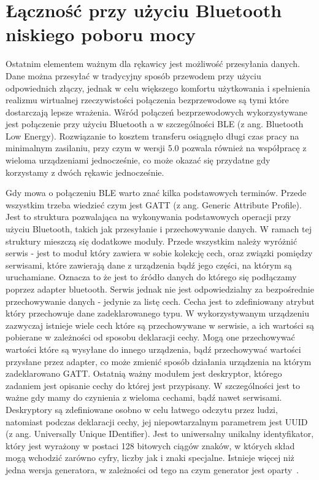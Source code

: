 \section{Łączność przy użyciu Bluetooth niskiego poboru mocy}
\label{sec:bvsble}
Ostatnim elementem ważnym dla rękawicy jest możliwość przesyłania danych. Dane można przesyłać w tradycyjny sposób przewodem przy użyciu odpowiednich złączy, jednak w celu większego komfortu użytkowania i spełnienia realizmu wirtualnej rzeczywistości połączenia bezprzewodowe są tymi które dostarczają lepsze wrażenia. Wśród połączeń bezprzewodowych wykorzystywane jest połączenie przy użyciu Bluetooth a w szczególności BLE (z ang. Bluetooth Low Energy). Rozwiązanie to kosztem transferu osiągnęło długi czas pracy na minimalnym zasilaniu, przy czym w wersji 5.0 pozwala również na współpracę z wieloma urządzeniami jednocześnie, co może okazać się przydatne gdy korzystamy z dwóch rękawic jednocześnie. 

Gdy mowa o połączeniu BLE warto znać kilka podstawowych terminów. Przede wszystkim trzeba wiedzieć czym jest GATT (z ang. Generic Attribute Profile). Jest to struktura pozwalająca na wykonywania podstawowych operacji przy użyciu Bluetooth, takich jak przesyłanie i przechowywanie danych.  W ramach tej struktury mieszczą się dodatkowe moduły. Przede wszystkim należy wyróżnić serwis - jest to moduł który zawiera w sobie kolekcję cech, oraz związki pomiędzy serwisami, które zawierają dane z urządzenia bądź jego części, na którym są uruchamiane. Oznacza to że jest to źródło danych do którego się podłączamy poprzez adapter bluetooth. Serwis jednak nie jest odpowiedzialny za bezpośrednie przechowywanie danych - jedynie za listę cech. Cecha jest to zdefiniowany atrybut który przechowuje dane zadeklarowanego typu. W wykorzystywanym urządzeniu zazwyczaj istnieje wiele cech które są przechowywane w serwisie, a ich wartości są pobierane w zależności od sposobu deklaracji cechy. Mogą one przechowywać wartości które są wysyłane do innego urządzenia, bądź przechowywać wartości przysłane przez adapter, co może zmienić sposób działania urządzenia na którym zadeklarowano GATT. Ostatnią ważny modułem jest deskryptor, którego zadaniem jest opisanie cechy do której jest przypisany. W szczególności jest to ważne gdy mamy do czynienia z wieloma cechami, bądź nawet serwisami. Deskryptory są zdefiniowane osobno w celu łatwego odczytu przez ludzi, natomiast podczas deklaracji cechy, jej niepowtarzalnym parametrem jest UUID (z ang. Universally Unique IDentifier). Jest to uniwersalny unikalny identyfikator, który jest wyrażony w postaci 128 bitowych ciągów znaków, w których skład mogą wchodzić zarówno cyfry, liczby jak i znaki specjalne. Istnieje więcej niż jedna wersja generatora, w zależności od tego na czym generator jest oparty~\cite{bleSpec}.
	
